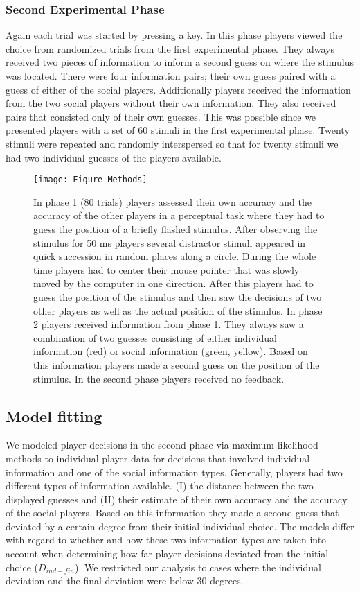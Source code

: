 \documentclass[jou]{apa}
\begin{document}
\subsubsection{Second Experimental Phase}
Again each trial was started by pressing a key. In this phase players viewed the choice from randomized trials from the first experimental phase. They always received two pieces of information to inform a second guess on where the stimulus was located. There were four information pairs; their own guess paired with a guess of either of the social players. Additionally players received the information from the two social players without their own information. They also received pairs that consisted only of their own guesses. This was possible since we presented players with a set of 60 stimuli in the first experimental phase. Twenty stimuli were repeated and randomly interspersed so that for twenty stimuli we had two individual guesses of the players available.
\begin{figure}
\texttt{[image: Figure\_Methods]}
\caption{In phase 1 (80 trials) players assessed their own accuracy and the accuracy of the other players in a perceptual task where they had to guess the position of a briefly flashed stimulus. After observing the stimulus for 50 ms players several distractor stimuli appeared in quick succession in random places along a circle. During the whole time players had to center their mouse pointer that was slowly moved by the computer in one direction. After this players had to guess the position of the stimulus and then saw the decisions of two other players as well as the actual position of the stimulus. In phase 2 players received information from phase 1. They always saw a combination of two guesses consisting of either individual information (red) or social information (green, yellow). Based on this information players made a second guess on the position of the stimulus. In the second phase players received no feedback.}
\end{figure}
\subsection{Model fitting}

We modeled player decisions in the second phase via maximum likelihood methods to individual player data for decisions that involved individual information and one of the social information types. Generally, players had two different types of information available. (I) the distance between the two displayed guesses and (II) their estimate of their own accuracy and the accuracy of the social players. Based on this information they made a second guess that deviated by a certain degree from their initial individual choice. The models differ with regard to whether and how these two information types are taken into account when determining how far player decisions deviated from the initial choice ($D_{ind-fin}$). We restricted our analysis to cases where the individual deviation and the final deviation were below 30 degrees.
\end{document}
